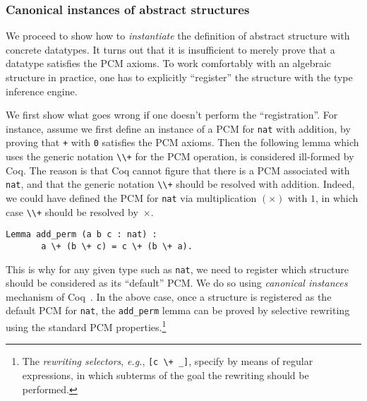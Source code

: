 \documentclass[blockstyle,preprint]{sigplanconf}
\newcommand{\is}[1]{\textcolor{blue}{(Ilya: {#1})}}
\newcommand{\an}[1]{\textcolor{red}{(Aleks: {#1})}}
\newcommand{\code}[1]{\lstinline{#1}}
\newcommand{\eg}{\emph{e.g.}\xspace}
\begin{document}
\subsubsection{Canonical instances of abstract structures}
\label{sec:canonicals}
We proceed to show how to \emph{instantiate} the definition of
abstract structure with concrete datatypes. It turns out that it is
insufficient to merely prove that a datatype satisfies the PCM
axioms. To work comfortably with an algebraic structure in practice,
one has to explicitly ``register'' the structure with the type
inference engine.

We first show what goes wrong if one doesn't perform the
``registration''.  For instance, assume we first define an instance of
a PCM for \code{nat} with addition, by proving that \code{+} with
\code{0} satisfies the PCM axioms.  Then the following lemma which
uses the generic notation \code{\\+} for the PCM operation, is
considered ill-formed by Coq. The reason is that Coq cannot figure
that there is a PCM associated with \code{nat}, and that the generic
notation \code{\\+} should be resolved with addition. Indeed, we could
have defined the PCM for \code{nat} via multiplication $(\times)$ with
$1$, in which case \code{\\+} should be resolved by~$\times$.
%
\begin{lstlisting}
Lemma add_perm (a b c : nat) : 
       a \+ (b \+ c) = c \+ (b \+ a).
\end{lstlisting}
%
This is why for any given type such as \code{nat}, we need to register
which structure should be considered as its ``default'' PCM. We do so
using \emph{canonical instances} mechanism of
Coq~\cite{Mahboubi-Tassi:ITP13,Saibi:PhD}. In the above case, once a
structure is registered as the default PCM for \code{nat}, the
\code{add_perm} lemma can be proved by selective rewriting using the
standard PCM properties.\footnote{The \emph{rewriting selectors}, \eg,
  \code{[c \+ _]}, specify by means of regular expressions, in which
  subterms of the goal the rewriting should be performed.}
%
%
\end{document}

